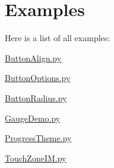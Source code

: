 \section{Examples}
Here is a list of all examples\-:\begin{DoxyCompactItemize}
\item 
\hyperlink{_button_align_8py-example}{Button\-Align.\-py}
\item 
\hyperlink{_button_options_8py-example}{Button\-Options.\-py}
\item 
\hyperlink{_button_radius_8py-example}{Button\-Radius.\-py}
\item 
\hyperlink{_gauge_demo_8py-example}{Gauge\-Demo.\-py}
\item 
\hyperlink{_progress_theme_8py-example}{Progress\-Theme.\-py}
\item 
\hyperlink{_touch_zone_i_m_8py-example}{Touch\-Zone\-I\-M.\-py}
\end{DoxyCompactItemize}
